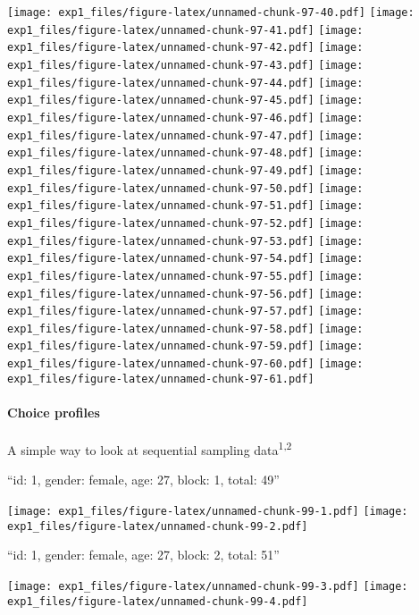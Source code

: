 \documentclass[,]{article}
\let\oldparagraph\paragraph
\renewcommand{\paragraph}[1]{\oldparagraph{#1}\mbox{}}
\newcommand*\cleartoleftpage{%
  \clearpage
  \ifodd\value{page}\hbox{}\newpage\fi
}
\begin{document}
\texttt{[image: exp1\_files/figure-latex/unnamed-chunk-97-40.pdf]}
\texttt{[image: exp1\_files/figure-latex/unnamed-chunk-97-41.pdf]}
\texttt{[image: exp1\_files/figure-latex/unnamed-chunk-97-42.pdf]}
\texttt{[image: exp1\_files/figure-latex/unnamed-chunk-97-43.pdf]}
\texttt{[image: exp1\_files/figure-latex/unnamed-chunk-97-44.pdf]}
\texttt{[image: exp1\_files/figure-latex/unnamed-chunk-97-45.pdf]}
\texttt{[image: exp1\_files/figure-latex/unnamed-chunk-97-46.pdf]}
\texttt{[image: exp1\_files/figure-latex/unnamed-chunk-97-47.pdf]}
\texttt{[image: exp1\_files/figure-latex/unnamed-chunk-97-48.pdf]}
\texttt{[image: exp1\_files/figure-latex/unnamed-chunk-97-49.pdf]}
\texttt{[image: exp1\_files/figure-latex/unnamed-chunk-97-50.pdf]}
\texttt{[image: exp1\_files/figure-latex/unnamed-chunk-97-51.pdf]}
\texttt{[image: exp1\_files/figure-latex/unnamed-chunk-97-52.pdf]}
\texttt{[image: exp1\_files/figure-latex/unnamed-chunk-97-53.pdf]}
\texttt{[image: exp1\_files/figure-latex/unnamed-chunk-97-54.pdf]}
\texttt{[image: exp1\_files/figure-latex/unnamed-chunk-97-55.pdf]}
\texttt{[image: exp1\_files/figure-latex/unnamed-chunk-97-56.pdf]}
\texttt{[image: exp1\_files/figure-latex/unnamed-chunk-97-57.pdf]}
\texttt{[image: exp1\_files/figure-latex/unnamed-chunk-97-58.pdf]}
\texttt{[image: exp1\_files/figure-latex/unnamed-chunk-97-59.pdf]}
\texttt{[image: exp1\_files/figure-latex/unnamed-chunk-97-60.pdf]}
\texttt{[image: exp1\_files/figure-latex/unnamed-chunk-97-61.pdf]}

\cleartoleftpage

\paragraph{Choice profiles}\label{choice-profiles}

A simple way to look at sequential sampling data\textsuperscript{1,2}

\newpage
[1] 

``id: 1, gender: female, age: 27, block: 1, total: 49''

\texttt{[image: exp1\_files/figure-latex/unnamed-chunk-99-1.pdf]}
\texttt{[image: exp1\_files/figure-latex/unnamed-chunk-99-2.pdf]}

\newpage
[1] 

``id: 1, gender: female, age: 27, block: 2, total: 51''

\texttt{[image: exp1\_files/figure-latex/unnamed-chunk-99-3.pdf]}
\texttt{[image: exp1\_files/figure-latex/unnamed-chunk-99-4.pdf]}

\newpage
[1] 
\end{document}

